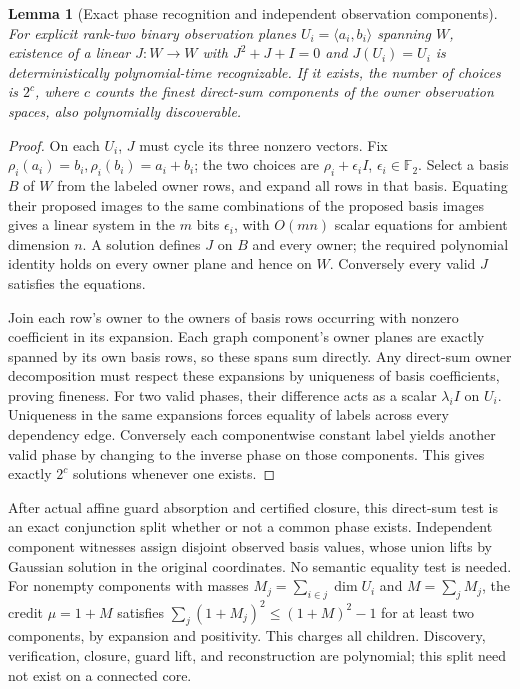 \documentclass[11pt]{article}
\newtheorem{lemma}[theorem]{Lemma}
\begin{document}
\begin{lemma}[Exact phase recognition and independent observation components]\label{lem:ba17-phase}
For explicit rank-two binary observation planes $U_i=\langle a_i,b_i\rangle$ spanning $W$, existence of a linear $J:W\to W$ with $J^2+J+I=0$ and $J(U_i)=U_i$ is deterministically polynomial-time recognizable. If it exists, the number of choices is $2^c$, where $c$ counts the finest direct-sum components of the owner observation spaces, also polynomially discoverable.
\end{lemma}
\begin{proof}
On each $U_i$, $J$ must cycle its three nonzero vectors. Fix $\rho_i(a_i)=b_i,\rho_i(b_i)=a_i+b_i$; the two choices are $\rho_i+\epsilon_i I$, $\epsilon_i\in\mathbb F_2$. Select a basis $B$ of $W$ from the labeled owner rows, and expand all rows in that basis. Equating their proposed images to the same combinations of the proposed basis images gives a linear system in the $m$ bits $\epsilon_i$, with $O(mn)$ scalar equations for ambient dimension $n$. A solution defines $J$ on $B$ and every owner; the required polynomial identity holds on every owner plane and hence on $W$. Conversely every valid $J$ satisfies the equations.

Join each row's owner to the owners of basis rows occurring with nonzero coefficient in its expansion. Each graph component's owner planes are exactly spanned by its own basis rows, so these spans sum directly. Any direct-sum owner decomposition must respect these expansions by uniqueness of basis coefficients, proving fineness. For two valid phases, their difference acts as a scalar $\lambda_i I$ on $U_i$. Uniqueness in the same expansions forces equality of labels across every dependency edge. Conversely each componentwise constant label yields another valid phase by changing to the inverse phase on those components. This gives exactly $2^c$ solutions whenever one exists.
\end{proof}
After actual affine guard absorption and certified closure, this direct-sum test is an exact conjunction split whether or not a common phase exists. Independent component witnesses assign disjoint observed basis values, whose union lifts by Gaussian solution in the original coordinates. No semantic equality test is needed. For nonempty components with masses $M_j=\sum_{i\in j}\dim U_i$ and $M=\sum_j M_j$, the credit $\mu=1+M$ satisfies $\sum_j(1+M_j)^2\le(1+M)^2-1$ for at least two components, by expansion and positivity. This charges all children. Discovery, verification, closure, guard lift, and reconstruction are polynomial; this split need not exist on a connected core.
\end{document}
